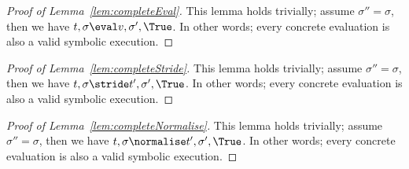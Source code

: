 




%



\begin{proof}[Proof of Lemma~\ref{lem:completeEval}]
This lemma holds trivially; assume $\sigma''=\sigma$, then we have $t,\sigma\eval v,\sigma',\True$.
In other words; every concrete evaluation is also a valid symbolic execution.
\end{proof}



\begin{proof}[Proof of Lemma~\ref{lem:completeStride}]
This lemma holds trivially; assume $\sigma''=\sigma$, then we have $t,\sigma\stride t',\sigma',\True$.
In other words; every concrete evaluation is also a valid symbolic execution.
\end{proof}



\begin{proof}[Proof of Lemma~\ref{lem:completeNormalise}]
This lemma holds trivially; assume $\sigma''=\sigma$, then we have $t,\sigma\normalise t',\sigma',\True$.
In other words; every concrete evaluation is also a valid symbolic execution.
\end{proof}



